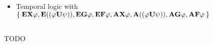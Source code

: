 \subsection{\CTL}

    \begin{itemize}

    \item   Temporal logic with
            $\Set{ \EX{\varphi}, \EU{\varphi}{\psi}, \EG{\varphi}, \EF{\varphi},
                   \AX{\varphi}, \AU{\varphi}{\psi}, \AG{\varphi}, \AF{\varphi} }$

    \end{itemize}

\subsection{\CTLs}

    TODO
